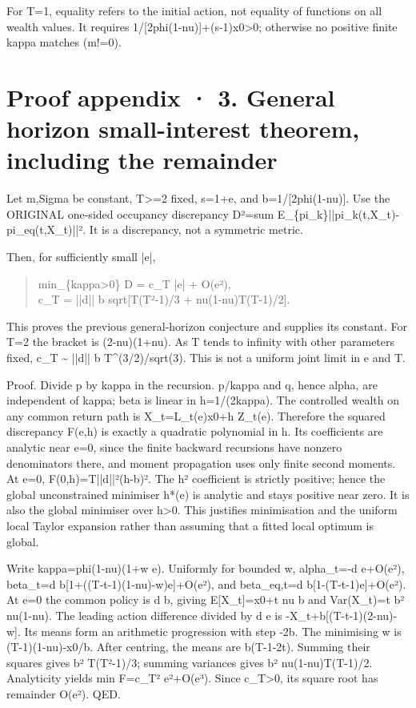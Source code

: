 \documentclass[10pt,a4paper]{article}
\begin{document}
For T=1, equality refers to the initial action, not equality of functions on all wealth values. It requires 1/[2phi(1-nu)]+(s-1)x0>0; otherwise no positive finite kappa matches (m!=0).

\clearpage
\section*{Proof appendix · 3. General horizon small-interest theorem, including the remainder}
Let m,Sigma be constant, T>=2 fixed, s=1+e, and b=1/[2phi(1-nu)]. Use the ORIGINAL one-sided occupancy discrepancy D²=sum E\_\{pi\_k\}||pi\_k(t,X\_t)-pi\_eq(t,X\_t)||². It is a discrepancy, not a symmetric metric.

Then, for sufficiently small |e|,

\begin{quote}\small
min\_\{kappa>0\} D = c\_T |e| + O(e²),\\
c\_T = ||d|| b sqrt[T(T²-1)/3 + nu(1-nu)T(T-1)/2].
\end{quote}
This proves the previous general-horizon conjecture and supplies its constant. For T=2 the bracket is (2-nu)(1+nu). As T tends to infinity with other parameters fixed, c\_T \textasciitilde{} ||d|| b T\textasciicircum{}(3/2)/sqrt(3). This is not a uniform joint limit in e and T.

Proof. Divide p by kappa in the recursion. p/kappa and q, hence alpha, are independent of kappa; beta is linear in h=1/(2kappa). The controlled wealth on any common return path is X\_t=L\_t(e)x0+h Z\_t(e). Therefore the squared discrepancy F(e,h) is exactly a quadratic polynomial in h. Its coefficients are analytic near e=0, since the finite backward recursions have nonzero denominators there, and moment propagation uses only finite second moments. At e=0, F(0,h)=T||d||²(h-b)². The h² coefficient is strictly positive; hence the global unconstrained minimiser h*(e) is analytic and stays positive near zero. It is also the global minimiser over h>0. This justifies minimisation and the uniform local Taylor expansion rather than assuming that a fitted local optimum is global.

Write kappa=phi(1-nu)(1+w e). Uniformly for bounded w, alpha\_t=-d e+O(e²), beta\_t=d b[1+((T-t-1)(1-nu)-w)e]+O(e²), and beta\_eq,t=d b[1-(T-t-1)e]+O(e²). At e=0 the common policy is d b, giving E[X\_t]=x0+t nu b and Var(X\_t)=t b² nu(1-nu). The leading action difference divided by d e is -X\_t+b[(T-t-1)(2-nu)-w]. Its means form an arithmetic progression with step -2b. The minimising w is (T-1)(1-nu)-x0/b. After centring, the means are b(T-1-2t). Summing their squares gives b² T(T²-1)/3; summing variances gives b² nu(1-nu)T(T-1)/2. Analyticity yields min F=c\_T² e²+O(e³). Since c\_T>0, its square root has remainder O(e²). QED.
\end{document}
